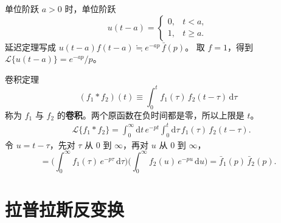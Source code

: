 \documentclass[fontset=windows, chinese, 10pt, xcolor=dvipsnames]{beamer}
\begin{document}
\begin{frame}{单位阶跃}
  $a>0$ 时，单位阶跃
  \begin{equation*}
    u(t-a)=\begin{cases}
      0, & t<a,\\
      1, & t\ge a.
    \end{cases}
  \end{equation*}
  延迟定理写成 $u(t-a)f(t-a)\fallingdotseq e^{-ap}\,\bar f(p)$。
  取 $f=1$，得到 $\mathcal{L}\{u(t-a)\}=e^{-ap}/p$。
  \vspace{0.3em}
  \centering
\end{frame}

\begin{frame}{卷积定理}
  \begin{equation*}
    (f_1*f_2)(t)
    \equiv\int_0^t f_1(\tau)\,f_2(t-\tau)\,\mathrm{d}\tau
  \end{equation*}
  称为 $f_1$ 与 $f_2$ 的\textbf{卷积}。两个原函数在负时间都是零，所以上限是 $t$。
  \begin{align*}
    &\mathcal{L}\{f_1*f_2\}
    =\int_0^{\infty}\mathrm{d}t\,e^{-pt}
      \int_0^t\mathrm{d}\tau\,f_1(\tau)\,f_2(t-\tau).
  \end{align*}
  令 $u=t-\tau$，先对 $\tau$ 从 $0$ 到 $\infty$，再对 $u$ 从 $0$ 到 $\infty$，
  \begin{equation*}
    =\Biggl(\int_0^{\infty} f_1(\tau)\,e^{-p\tau}\,\mathrm{d}\tau\Biggr)
     \Biggl(\int_0^{\infty} f_2(u)\,e^{-pu}\,\mathrm{d}u\Biggr)
    =\bar f_1(p)\,\bar f_2(p).
  \end{equation*}
\end{frame}

\section{拉普拉斯反变换}
\end{document}
